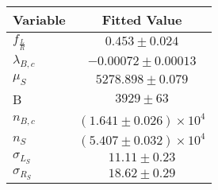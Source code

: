 \begin{tabular}[t]{lc}
\hline
Variable &Fitted Value\\
\hline\hline
$f_{\frac{L}{R}}$&$0.453\pm0.024$\\
\hline
$\lambda_{B,c}$&$-0.00072\pm0.00013$\\
\hline
$\mu_S$&$5278.898\pm0.079$\\
\hline
B&$3929\pm63$\\
\hline
$n_{B,c}$&$(1.641\pm0.026)\times 10^4$\\
\hline
$n_S$&$(5.407\pm0.032)\times 10^4$\\
\hline
$\sigma_{L_S}$&$11.11\pm0.23$\\
\hline
$\sigma_{R_S}$&$18.62\pm0.29$\\
\hline
\end{tabular}
